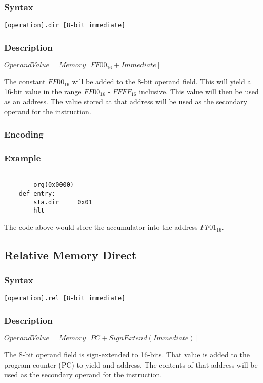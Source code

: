 \subsubsection{Syntax}
\begin{verbatim}[operation].dir [8-bit immediate]\end{verbatim}

\subsubsection{Description}
$OperandValue = Memory[FF00_{16} + Immediate]$
\par The constant $FF00_{16}$ will be added to the 8-bit operand field.
This will yield a 16-bit value in the range $FF00_{16}$ - $FFFF_{16}$ inclusive.
This value will then be used as an address.
The value stored at that address will be used as the secondary operand for the instruction.

\subsubsection{Encoding}

\subsubsection{Example}
\begin{verbatim}

        org(0x0000)
    def entry:
        sta.dir     0x01
        hlt

\end{verbatim}
The code above would store the accumulator into the address $FF01_{16}$.
\pagebreak

\subsection{Relative Memory Direct}\label{subsec:relative-direct-(rel)}

\subsubsection{Syntax}
\begin{verbatim}[operation].rel [8-bit immediate]\end{verbatim}

\subsubsection{Description}
$OperandValue = Memory[PC + SignExtend(Immediate)]$
\par The 8-bit operand field is sign-extended to 16-bits.
That value is added to the program counter (PC) to yield and address.
The contents of that address will be used as the secondary operand for the instruction.

